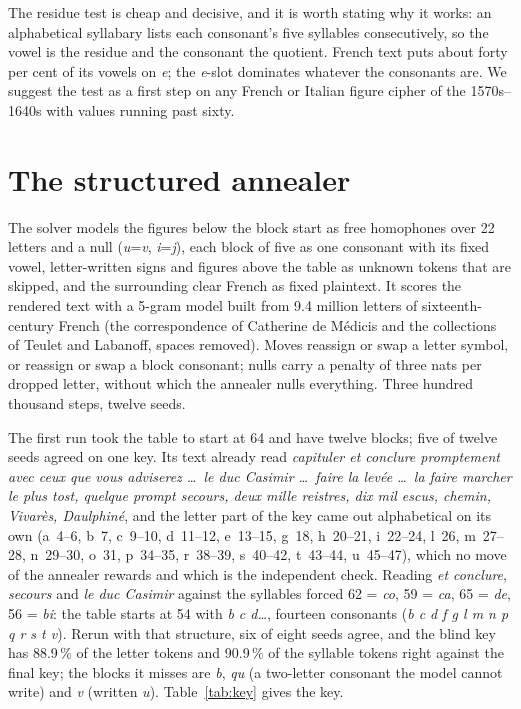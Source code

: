 \documentclass[11pt]{article}
\begin{document}
The residue test is cheap and decisive, and it is worth stating why it works: an alphabetical syllabary lists each consonant's five syllables consecutively, so the vowel is the residue and the consonant the quotient. French text puts about forty per cent of its vowels on \emph{e}; the \emph{e}-slot dominates whatever the consonants are. We suggest the test as a first step on any French or Italian figure cipher of the 1570s--1640s with values running past sixty.

\section{The structured annealer}

The solver models the figures below the block start as free homophones over 22 letters and a null (\emph{u}=\emph{v}, \emph{i}=\emph{j}), each block of five as one consonant with its fixed vowel, letter-written signs and figures above the table as unknown tokens that are skipped, and the surrounding clear French as fixed plaintext. It scores the rendered text with a 5-gram model built from 9.4 million letters of sixteenth-century French (the correspondence of Catherine de M\'edicis and the collections of Teulet and Labanoff, spaces removed). Moves reassign or swap a letter symbol, or reassign or swap a block consonant; nulls carry a penalty of three nats per dropped letter, without which the annealer nulls everything. Three hundred thousand steps, twelve seeds.

The first run took the table to start at 64 and have twelve blocks; five of twelve seeds agreed on one key. Its text already read \emph{capituler et conclure promptement avec ceux que vous adviserez \ldots\ le duc Casimir \ldots\ faire la lev\'ee \ldots\ la faire marcher le plus tost, quelque prompt secours, deux mille reistres, dix mil escus, chemin, Vivar\`es, Daulphin\'e}, and the letter part of the key came out alphabetical on its own (a~4--6, b~7, c~9--10, d~11--12, e~13--15, g~18, h~20--21, i~22--24, l~26, m~27--28, n~29--30, o~31, p~34--35, r~38--39, s~40--42, t~43--44, u~45--47), which no move of the annealer rewards and which is the independent check. Reading \emph{et conclure}, \emph{secours} and \emph{le duc Casimir} against the syllables forced 62 = \emph{co}, 59 = \emph{ca}, 65 = \emph{de}, 56 = \emph{bi}: the table starts at 54 with \emph{b c d\ldots}, fourteen consonants (\emph{b c d f g l m n p q r s t v}). Rerun with that structure, six of eight seeds agree, and the blind key has 88.9\,\% of the letter tokens and 90.9\,\% of the syllable tokens right against the final key; the blocks it misses are \emph{b}, \emph{qu} (a two-letter consonant the model cannot write) and \emph{v} (written \emph{u}). Table~\ref{tab:key} gives the key.
\end{document}
